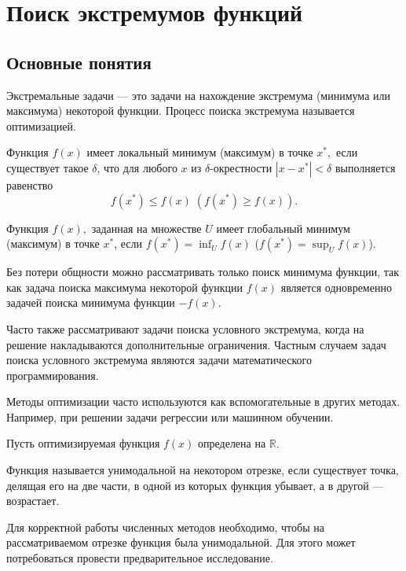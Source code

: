 \section{Поиск экстремумов функций}


\subsection{Основные понятия}

Экстремальные задачи — это задачи на нахождение экстремума (минимума
или максимума) некоторой функции. Процесс поиска экстремума называется
оптимизацией.
\begin{defn}
Функция $f(x)$ имеет локальный минимум (максимум) в точке $x^{*},$
если существует такое $\delta$, что для любого $x$ из $\delta$-окрестности
$|x-x^{*}|<\delta$ выполняется равенство 
\[
f(x^{*})\leqslant f(x)\;(f(x^{*})\geqslant f(x)).
\]

\end{defn}

\begin{defn}
Функция $f(x),$ заданная на множестве $U$ имеет глобальный минимум
(максимум) в точке $x^{*}$, если $f(x^{*})=\inf_{U}f(x)$ ($f(x^{*})=\sup_{U}f(x)$).
\end{defn}
Без потери общности можно рассматривать только поиск минимума функции,
так как задача поиска максимума некоторой функции $f(x)$ является
одновременно задачей поиска минимума функции $-f(x).$

Часто также рассматривают задачи поиска условного экстремума, когда
на решение накладываются дополнительные ограничения. Частным случаем
задач поиска условного экстремума являются задачи математического
программирования.

Методы оптимизации часто используются как вспомогательные в других
методах. Например, при решении задачи регрессии или машинном обучении. 

Пусть оптимизируемая функция $f(x)$ определена на $\mathbb{R}$.
\begin{defn}
Функция называется унимодальной на некотором отрезке, если существует
точка, делящая его на две части, в одной из которых функция убывает,
а в другой — возрастает.
\end{defn}
Для корректной работы численных методов необходимо, чтобы на рассматриваемом
отрезке функция была унимодальной. Для этого может потребоваться провести
предварительное исследование.



